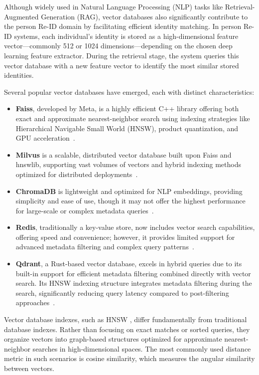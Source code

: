 \documentclass[../main.tex]{subfiles}
\begin{document}
Although widely used in Natural Language Processing (NLP) tasks like Retrieval-Augmented Generation (RAG), vector databases also significantly contribute to the person Re-ID domain by facilitating efficient identity matching. In person Re-ID systems, each individual's identity is stored as a high-dimensional feature vector—commonly 512 or 1024 dimensions—depending on the chosen deep learning feature extractor. During the retrieval stage, the system queries this vector database with a new feature vector to identify the most similar stored identities.

Several popular vector databases have emerged, each with distinct characteristics:

\begin{itemize}
  \item \textbf{Faiss}, developed by Meta, is a highly efficient C++ library offering both exact and approximate nearest-neighbor search using indexing strategies like Hierarchical Navigable Small World (HNSW), product quantization, and GPU acceleration~\cite{faiss}.
  
  \item \textbf{Milvus} is a scalable, distributed vector database built upon Faiss and hnswlib, supporting vast volumes of vectors and hybrid indexing methods optimized for distributed deployments~\cite{milvus}.
  
  \item \textbf{ChromaDB} is lightweight and optimized for NLP embeddings, providing simplicity and ease of use, though it may not offer the highest performance for large-scale or complex metadata queries~\cite{chromadb}.
  
  \item \textbf{Redis}, traditionally a key-value store, now includes vector search capabilities, offering speed and convenience; however, it provides limited support for advanced metadata filtering and complex query patterns~\cite{redis_vector}.
  
  \item \textbf{Qdrant}, a Rust-based vector database, excels in hybrid queries due to its built-in support for efficient metadata filtering combined directly with vector search. Its HNSW indexing structure integrates metadata filtering during the search, significantly reducing query latency compared to post-filtering approaches~\cite{qdrant}.
\end{itemize}

Vector database indexes, such as HNSW \cite{hnsw}, differ fundamentally from traditional database indexes. Rather than focusing on exact matches or sorted queries, they organize vectors into graph-based structures optimized for approximate nearest-neighbor searches in high-dimensional spaces. The most commonly used distance metric in such scenarios is cosine similarity, which measures the angular similarity between vectors.
\end{document}
